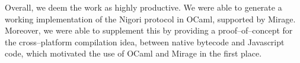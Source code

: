 Overall, we deem the work as highly productive.
We were able to generate a working implementation of the Nigori protocol in OCaml, supported by Mirage.
Moreover, we were able to supplement this by providing a proof--of--concept for the cross--platform compilation idea, between native bytecode and Javascript code, which motivated the use of OCaml and Mirage in the first place.
